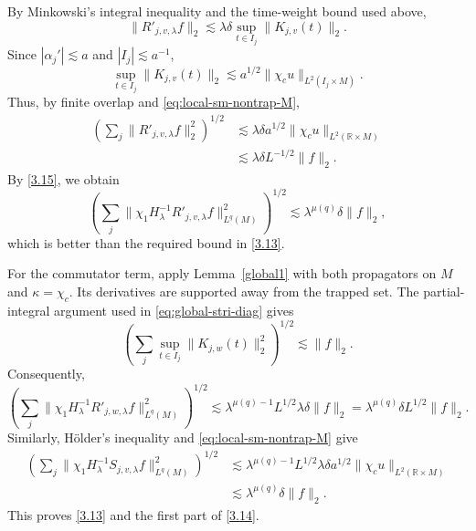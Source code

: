 \documentclass[11pt]{amsart}
\newcommand{\la}{\lambda}
\begin{document}
By Minkowski's integral inequality and the time-weight bound used above,
\begin{equation}\label{eq:Rv-pointwise}
\|R'_{j,v,\la}f\|_2\lesssim\la\delta\sup_{t\in I_j}\|K_{j,v}(t)\|_2.
\end{equation}
Since $|\alpha_j'|\lesssim a$ and $|I_j|\lesssim a^{-1}$,
\[
\sup_{t\in I_j}\|K_{j,v}(t)\|_2
\lesssim a^{1/2}\|\chi_cu\|_{L^2(I_j\times M)}.
\]
Thus, by finite overlap and \eqref{eq:local-sm-nontrap-M},
\begin{equation}\label{3.16}
\begin{split}
\left(\sum_j\|R'_{j,v,\la}f\|_2^2\right)^{1/2}
&\lesssim\la\delta a^{1/2}\|\chi_cu\|_{L^2(\mathbb R\times M)}\\
&\lesssim\la\delta L^{-1/2}\|f\|_2.
\end{split}
\end{equation}
By \eqref{3.15}, we obtain
\[
\left(\sum_j\|\chi_1H_\la^{-1}R'_{j,v,\la}f\|_{L^q(M)}^2\right)^{1/2}
\lesssim\la^{\mu(q)}\delta\|f\|_2,
\]
which is better than the required bound in \eqref{3.13}.

For the commutator term, apply Lemma~\ref{global1} with both propagators on $M$ and $\kappa=\chi_c$. Its derivatives are supported away from the trapped set. The partial-integral argument used in \eqref{eq:global-stri-diag} gives
\[
\left(\sum_j\sup_{t\in I_j}\|K_{j,w}(t)\|_2^2\right)^{1/2}\lesssim\|f\|_2.
\]
Consequently,
\[
\left(\sum_j\|\chi_1H_\la^{-1}R'_{j,w,\la}f\|_{L^q(M)}^2\right)^{1/2}
\lesssim\la^{\mu(q)-1}L^{1/2}\la\delta\|f\|_2
=\la^{\mu(q)}\delta L^{1/2}\|f\|_2.
\]
Similarly, H\"older's inequality and \eqref{eq:local-sm-nontrap-M} give
\begin{align*}
\left(\sum_j\|\chi_1H_\la^{-1}S_{j,v,\la}f\|_{L^q(M)}^2\right)^{1/2}
&\lesssim\la^{\mu(q)-1}L^{1/2}\la\delta a^{1/2}
\|\chi_cu\|_{L^2(\mathbb R\times M)}\\
&\lesssim\la^{\mu(q)}\delta\|f\|_2.
\end{align*}
This proves \eqref{3.13} and the first part of \eqref{3.14}.
\end{document}
